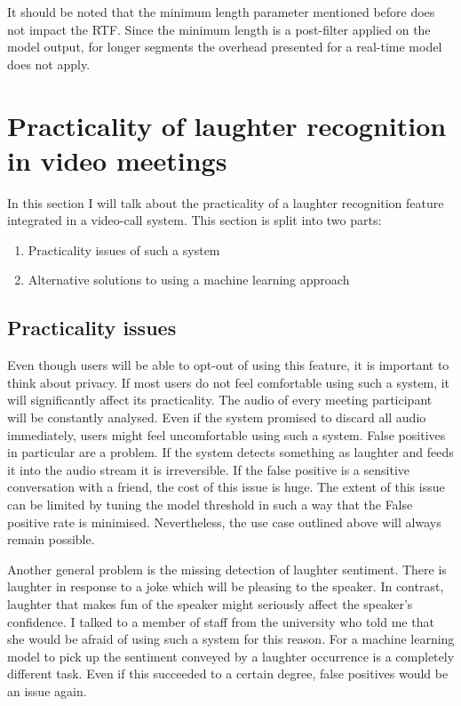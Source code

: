 \documentclass[bsc,frontabs,parskip,deptreport]{infthesis}
\begin{document}
It should be noted that the minimum length parameter mentioned before does not impact the RTF. 
Since the minimum length is a post-filter applied on the model output, for longer segments the overhead presented for a real-time model does not apply. 


\chapter{Practicality of laughter recognition in video meetings}
In this section I will talk about the practicality of a laughter recognition feature integrated in a video-call system. 
This section is split into two parts: 
\begin{enumerate}
    \item Practicality issues of such a system
    \item Alternative solutions to using a machine learning approach 
\end{enumerate}

\section{Practicality issues} \label{sec:general-pract}
Even though users will be able to opt-out of using this feature, it is important to think about privacy. If most users do not feel comfortable using such a system, it will significantly affect its practicality.  
The audio of every meeting participant will be constantly analysed. Even if the system promised to discard all audio immediately, users might feel uncomfortable using such a system. False positives in particular are a problem. If the system detects something as laughter and feeds it into the audio stream it is irreversible. If the false positive is a sensitive conversation with a friend, the cost of this issue is huge. 
The extent of this issue can be limited by tuning the model threshold in such a way that the False positive rate is minimised. Nevertheless, the use case outlined above will always remain possible. 

Another general problem is the missing detection of laughter sentiment. There is laughter in response to a joke which will be pleasing to the speaker. In contrast, laughter that makes fun of the speaker might seriously affect the speaker's confidence. I talked to a member of staff from the university who told me that she would be afraid of using such a system for this reason. 
For a machine learning model to pick up the sentiment conveyed by a laughter occurrence is a completely different task. Even if this succeeded to a certain degree, false positives would be an issue again. 
\end{document}
